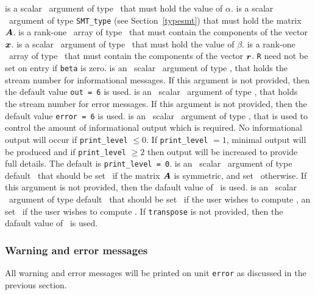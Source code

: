 \documentclass{galahad}
\begin{document}
\begin{description}
   is a scalar \intentin\ argument of type \realdp\ that
     must hold the value of $\alpha$.
   is a scalar \intentin\ argument of type {\tt SMT\_type} (see
     Section~\ref{typesmt}) that must hold the matrix ${\bm{A}}$.
   is a rank-one \intentin\ array of type \realdp\ that must
     contain the components of the vector ${\bm{x}}$.
   is a scalar \intentin\ argument of type \realdp\ that
     must hold the value of $\beta$.
   is a rank-one \intentinout\ array of type \realdp\ that must
  contain the components of the vector ${\bm{r}}$. {\tt R} need not be set
  on entry if {\tt beta} is zero.
   is an \optional\ scalar \intentin\ argument of type \integer, that holds the
     stream number for informational messages. If this argument is not
     provided, then the default value {\tt out = 6} is used.
   is an \optional\ scalar \intentin\ argument of type \integer, that holds the
     stream number for error messages. If this argument is not
     provided, then the default value {\tt error = 6} is used.
   is an \optional\ scalar \intentin\ argument of type \integer, that is used
     to control the amount of informational output which is required. No 
     informational output will occur if {\tt print\_level} $\leq 0$. If 
     {\tt print\_level} $= 1$, minimal output will be produced and if
     {\tt print\_level} $\geq 2$ then output will be
     increased to provide full details.
     The default is {\tt print\_level = 0}.
   is an \optional\ scalar \intentin\ argument of type default
     \logical\ that should be set \true\ if the matrix ${\bm{A}}$ is
     symmetric, and set \false\ otherwise.  If this argument is not
     provided, then the dafault value of \false\ is used. 
   is an \optional\ scalar \intentin\ argument of type default
     \logical\ that should be set \false\ if the user wishes to compute
     , an set \true\ if the user wishes to compute .
     If {\tt transpose} is not provided, then the dafault value of
     \false\ is used. 
\end{description}

\subsubsection{Warning and error messages}\label{Ax-error}

All warning and error messages will be printed on unit {\tt error} as
discussed in the previous section.
\end{document}
